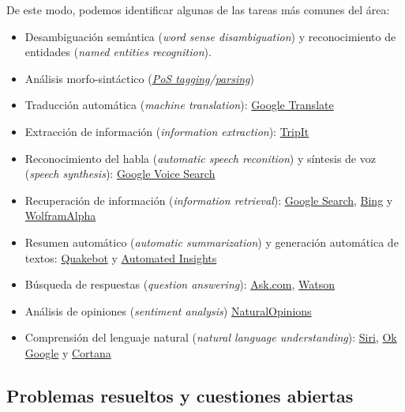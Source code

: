 \documentclass[]{tufte-handout}
\begin{document}
De este modo, podemos identificar algunas de las tareas más comunes del
área:

\begin{itemize}
\item
  Desambiguación semántica (\emph{word sense disambiguation}) y
  reconocimiento de entidades (\emph{named entities recognition}).
\item
  Análisis morfo-sintáctico
  (\emph{\href{http://nbviewer.ipython.org/gist/vitojph/5465948}{PoS
  tagging}/\href{http://nbviewer.ipython.org/gist/vitojph/5524353}{parsing}})
\item
  Traducción automática (\emph{machine translation}):
  \href{http://translate.google.es}{Google Translate}
\item
  Extracción de información (\emph{information extraction}):
  \href{https://www.tripit.com/}{TripIt}
\item
  Reconocimiento del habla (\emph{automatic speech reconition}) y
  síntesis de voz (\emph{speech synthesis}):
  \href{http://www.google.com/insidesearch/features/voicesearch/index-chrome.html}{Google
  Voice Search}
\item
  Recuperación de información (\emph{information retrieval}):
  \href{}{Google Search}, \href{http://www.bing.com}{Bing} y
  \href{http://www.wolframalpha.com/}{Wolfram\textbar{}Alpha}
\item
  Resumen automático (\emph{automatic summarization}) y generación
  automática de textos:
  \href{http://www.latimes.com/local/earthquakes/}{Quakebot} y
  \href{http://automatedinsights.com/}{Automated Insights}
\item
  Búsqueda de respuestas (\emph{question answering}):
  \href{http://www.ask.com}{Ask.com},
  \href{http://www.youtube.com/watch?v=WFR3lOm_xhE}{Watson}
\item
  Análisis de opiniones (\emph{sentiment analysis})
  \href{http://demos.bitext.com/naturalopinions/}{NaturalOpinions}
\item
  Comprensión del lenguaje natural (\emph{natural language
  understanding}): \href{http://www.apple.com/es/ios/siri/}{Siri},
  \href{https://support.google.com/websearch/answer/2940021?hl=es}{Ok
  Google} y
  \href{http://windows.microsoft.com/es-es/windows-10/getstarted-what-is-cortana}{Cortana}
\end{itemize}

\subsection{Problemas resueltos y cuestiones
abiertas}\label{problemas-resueltos-y-cuestiones-abiertas}
\end{document}
